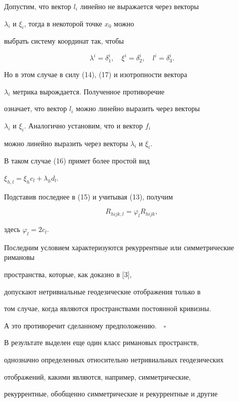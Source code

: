 Допустим, что вектор $l_i$ линейно не выражается через векторы


$\lambda_i$ и $\xi_i$, тогда в некоторой точке $x_0$ можно


выбрать систему координат так, чтобы


$$


\lambda^i=\delta_1^i,\quad


\xi ^i=\delta_2^i,\quad l^i=\delta_3^i.


$$


Но в этом случае в силу (14), (17) и изотропности вектора


$\lambda_i$ метрика вырождается. Полученное противоречие


означает, что вектор $l_i$ можно линейно выразить через векторы


$\lambda_i$ и $\xi_i$. Аналогично установим, что и вектор $f_i$


можно линейно выразить через векторы $\lambda_i$ и $\xi_i$.


В таком случае (16) примет более простой вид


$\xi_{h,l}=\xi_hc_l+\lambda_hd_l$.


Подставив последнее в (15) и учитывая (13), получим


$$


R_{hijk,l}=\varphi_lR_{hijk},


$$


здесь $\varphi_l=2 c_l$.





Последним условием характеризуются рекуррентные или симметрические римановы


пространства, которые, как доказно в [3],


допускают нетривиальные геодезические отображения только в


том случае, когда являются пространствами постоянной кривизны.


А это противоречит сделанному предположению.$\quad\square$





В результате выделен еще один класс римановых пространств,


однозначно определенных относительно нетривиальных геодезических


отображений, какими являются, например, симметрические,


рекуррентные, обобщенно симметрические и рекуррентные и другие


